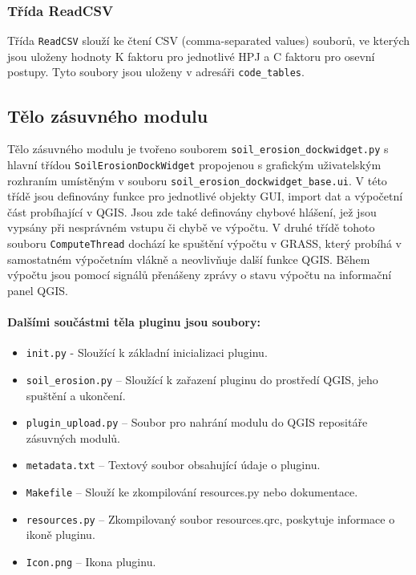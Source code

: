 \subsubsection{Třída ReadCSV} Třída \texttt{ReadCSV} slouží ke čtení
CSV (comma-separated values) souborů, ve kterých jsou uloženy hodnoty
K faktoru pro jednotlivé HPJ a C faktoru pro osevní postupy. Tyto
soubory jsou uloženy v adresáři \texttt{code\_tables}.

\subsection{Tělo zásuvného modulu} Tělo zásuvného modulu je tvořeno
souborem \texttt{soil\_erosion\_dockwidget.py} s hlavní třídou
\texttt{SoilErosionDockWidget} propojenou s grafickým uživatelským
rozhraním umístěným v souboru
\texttt{soil\_erosion\_dockwidget\_base.ui}. V této třídě jsou
definovány funkce pro jednotlivé objekty GUI, import dat a výpočetní
část probíhající v QGIS. Jsou zde také definovány chybové hlášení, jež
jsou vypsány při nesprávném vstupu či chybě ve výpočtu. V druhé třídě
tohoto souboru \texttt{ComputeThread} dochází ke spuštění výpočtu v
GRASS, který probíhá v samostatném výpočetním vlákně a neovlivňuje
další funkce QGIS. Během výpočtu jsou pomocí signálů přenášeny zprávy
o stavu výpočtu na informační panel QGIS.

\paragraph{Dalšími součástmi těla pluginu jsou soubory:}
\begin{itemize}
	\item \texttt{init.py} - Sloužící k základní inicializaci
pluginu.
	\item \texttt{soil\_erosion.py} – Sloužící k zařazení pluginu
do prostředí QGIS, jeho spuštění a ukončení.
	\item \texttt{plugin\_upload.py} – Soubor pro nahrání modulu
do QGIS repositáře zásuvných modulů.
	\item \texttt{metadata.txt} – Textový soubor obsahující údaje
o pluginu.
	\item \texttt{Makefile} – Slouží ke zkompilování resources.py
nebo dokumentace.
	\item \texttt{resources.py} – Zkompilovaný soubor
resources.qrc, poskytuje informace o ikoně pluginu.
	\item \texttt{Icon.png} – Ikona pluginu.
\end{itemize}
\newpage
